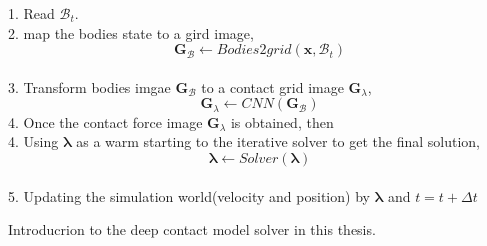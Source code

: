\begin{algorithm}[!ht]
        {
            1. Read $\mathcal{B}_t$. \\
            2. map the bodies state to a gird image,
                $$\pmb{G}_{\mathcal{B}} \gets Bodies2grid(\mathbf{x}, \mathcal{B}_t)$$ \\
            3. Transform bodies imgae $\pmb{G}_{\mathcal{B}}$ to a contact grid image $\pmb{G}_{\lambda}$,
            $$\pmb{G}_{\lambda} \gets CNN(\pmb{G}_{\mathcal{B}})$$
            4. Once the contact force image $\pmb{G}_{\lambda}$ is obtained,  then \\
            4. Using $\pmb{\lambda}$ as a warm starting to the iterative solver to get the final solution,
            $$\pmb{\lambda} \gets Solver(\pmb{\lambda})$$ \\
            5. Updating the simulation world(velocity and position) by $\pmb{\lambda}$ and $t = t+\Delta t$
        }
        \caption{Introducrion to the deep contact model solver in this thesis.}
        \label{al:basic}
\end{algorithm}
